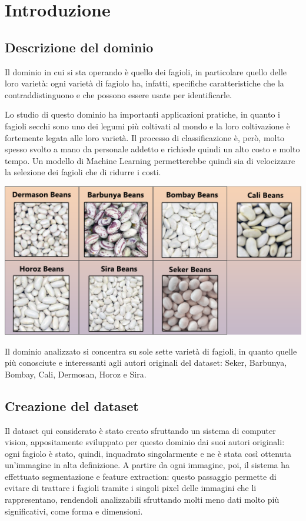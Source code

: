\section{Introduzione}
\subsection{Descrizione del dominio}
Il dominio in cui si sta operando è quello dei fagioli, in particolare quello
delle loro varietà: ogni varietà di fagiolo ha, infatti, specifiche
caratteristiche che la contraddistinguono e che possono essere usate per
identificarle.

Lo studio di questo dominio ha importanti applicazioni pratiche, in 
quanto i fagioli secchi sono uno dei legumi più coltivati al mondo e la loro
coltivazione è fortemente legata alle loro varietà. 
Il processo di classificazione è, però, molto spesso svolto a mano 
da personale addetto e richiede quindi un alto costo e molto tempo.
Un modello di Machine Learning permetterebbe
quindi sia di velocizzare la selezione dei fagioli che di ridurre i costi.

\begin{Figure}
    \centering
    \includegraphics[width=\linewidth]{img/dry_beans.png}
\end{Figure}

Il dominio analizzato si concentra su sole sette varietà di fagioli, in quanto
quelle più conosciute e interessanti agli autori originali del dataset:
Seker, Barbunya, Bombay, Cali, Dermosan, Horoz e Sira.

\subsection{Creazione del dataset}
Il dataset \cite{dry_bean_dataset} qui considerato è stato creato sfruttando un
sistema di computer vision, appositamente sviluppato per questo dominio
dai suoi autori originali: ogni fagiolo è stato, quindi, inquadrato 
singolarmente e ne è stata così ottenuta un'immagine in alta definizione.
A partire da ogni immagine, poi, il sistema ha effettuato segmentazione
e feature extraction: questo passaggio permette di evitare di trattare
i fagioli tramite i singoli pixel delle immagini che li rappresentano,
rendendoli analizzabili sfruttando molti meno dati molto più significativi,
come forma e dimensioni.